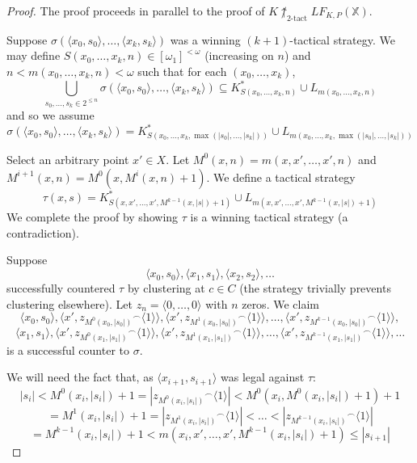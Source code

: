 \documentclass[11pt]{article}
\theoremstyle{plain}
\theoremstyle{definition}
\theoremstyle{remark}
\newcommand{\ktactwin}[1]{\uparrow_{#1\text{-tact}}}
\newcommand{\lfkpgame}[1]{LF_{K,P}(#1)}
\newcommand{\<}{\langle}
\renewcommand{\>}{\rangle}
\begin{document}
\begin{proof}
The proof proceeds in parallel to the proof of $K\not\ktactwin{2}\lfkpgame{\mathbb{X}}$.

Suppose $\sigma(\<x_0,s_0\>,\dots,\<x_{k},s_{k}\>)$ was a winning $(k+1)$-tactical strategy. We may define $S(x_0,\dots,x_{k},n)\in [\omega_1]^{<\omega}$ (increasing on $n$) and $n<m(x_0,\dots,x_{k},n)<\omega$ such that for each $(x_0,\dots,x_{k})$,
  \[
    \bigcup_{s_0,\dots,s_k \in 2^{\leq n}} \sigma(\<x_0,s_0\>,\dots,\<x_{k},s_{k}\>) \subseteq 
    K^*_{S(x_0,\dots,x_{k},n)} \cup L_{m(x_0,\dots,x_{k},n)}
  \]
and so we assume
  \[
    \sigma(\<x_0,s_0\>,\dots,\<x_{k},s_{k}\>) =
    K^*_{S(x_0,\dots,x_{k},\max(|s_0|,\dots,|s_k|))} \cup L_{m(x_0,\dots,x_{k},\max(|s_0|,\dots,|s_k|))}
  \]

Select an arbitrary point $x' \in X$. Let $M^0(x,n)=m(x,x',\dots,x',n)$ and $M^{i+1}(x,n)=M^0(x,M^i(x,n)+1)$. We define a tactical strategy 
  \[
  \tau(x,s) = K^*_{S(x,x',\dots,x',M^{k-1}(x,|s|)+1)} \cup L_{m(x,x',\dots,x',M^{k-1}(x,|s|)+1)}
  \]
We complete the proof by showing $\tau$ is a winning tactical strategy (a contradiction).

Suppose
\[
\<x_0, s_0\>, \<x_1, s_1\>, \<x_2, s_2\>, \dots
\]
successfully countered $\tau$ by clustering at $c\in C$ (the strategy trivially prevents clustering elsewhere). Let $z_n = \<0,\dots,0\>$ with $n$ zeros. We claim
\[
  \<x_0, s_0\>, 
  \<x', {z_{M^0(x_0,|s_0|)}}^\frown\<1\>\>,
  \<x', {z_{M^1(x_0,|s_0|)}}^\frown\<1\>\>, 
  \dots, 
  \<x', {z_{M^{k-1}(x_0,|s_0|)}}^\frown\<1\>\>,
\]
\[
  \<x_1, s_1\>, 
  \<x', {z_{M^0(x_1,|s_1|)}}^\frown\<1\>\>, 
  \<x', {z_{M^1(x_1,|s_1|)}}^\frown\<1\>\>, 
  \dots, 
  \<x', {z_{M^{k-1}(x_1,|s_1|)}}^\frown\<1\>\>, 
  \dots
\]
is a successful counter to $\sigma$.

We will need the fact that, as $\<x_{i+1},s_{i+1}\>$ was legal against $\tau$:
  \[
    |s_i| <
    M^0(x_i,|s_i|)+1 =
    |{z_{M^0(x_i,|s_i|)}}^\frown\<1\>| <
    M^0(x_i,M^0(x_i,|s_i|)+1)+1 
  \]
  \[
    =
    M^1(x_i,|s_i|)+1 =
    |{z_{M^1(x_i,|s_i|)}}^\frown\<1\>| <
    \dots <
    |{z_{M^{k-1}(x_i,|s_i|)}}^\frown\<1\>| 
  \]
  \[
    =
    M^{k-1}(x_i,|s_i|) + 1 <
    m(x_i,x',\dots,x',M^{k-1}(x_i,|s_i|)+1) \leq
    |s_{i+1}|
  \]


\end{proof}
\end{document}
